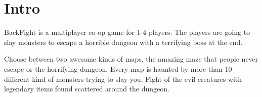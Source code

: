 \pagestyle{Uni}

\chapter{Intro}
BackFight is a multiplayer co-op game for 1-4 players. The players are going to slay monsters to escape a horrible dungeon with a terrifying boss at the end. 

Choose between two awesome kinds of maps, the amazing maze that people never escape or the horrifying dungeon. Every map is haunted by more than 10 different kind of monsters trying to slay you. Fight of the evil creatures with legendary items found scattered around the dungeon.